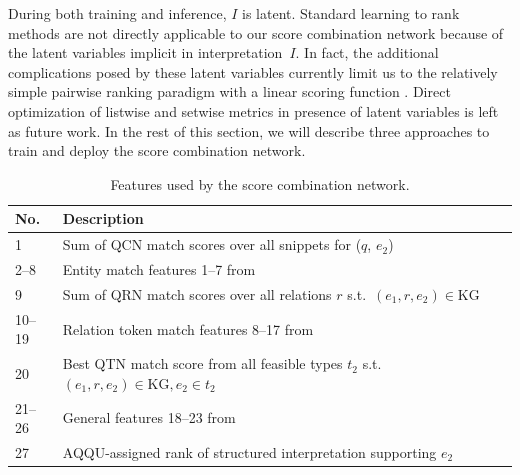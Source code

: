 \documentclass{svjour3}
\begin{document}
During both training and inference, $I$ is latent.  Standard learning to rank methods \citep{Liu2009LearningToRank} are not directly applicable to our score combination network because of the latent variables implicit in interpretation~$I$.  In fact, the additional complications posed by these latent variables currently limit us to the relatively simple pairwise ranking paradigm with a linear scoring function \citep{Joachims2002ranksvm}.  Direct optimization of listwise and setwise metrics in presence of latent variables is left as future work.  In the rest of this section, we will describe three approaches to train and deploy the score combination network.


\begin{table}[t]
  \centering
  \begin{small}
  \begin{tabular}{|l|l|} %
  \hline
  No. & Description \\
  \hline
1 & Sum of QCN match scores over all snippets for ($q$, $e_2$)\\
 \hline
2--8 & Entity match features 1--7 from~\citet{BastH2015aqqu} \\
 \hline
9 & Sum of QRN match scores over all relations $r$ s.t.\ $(e_1,r,e_2) \in \text{KG}$ \\
 \hline
 10--19 & Relation token match features 8--17 from~\citet{BastH2015aqqu} \\
 \hline
20 & Best QTN match score from all feasible types $t_2$ s.t.\ $(e_1, r, e_2) \in \text{KG}, e_2 \in t_2$ \\
 \hline
 21--26 & General features 18--23 from~\citet{BastH2015aqqu}\\  
 \hline
 27 & AQQU-assigned rank of structured interpretation supporting $e_2$ \\
  \hline
  \end{tabular}
  \end{small}
  \caption{Features used by the score combination network.}
  \label{tab:features}
\end{table}
\end{document}
